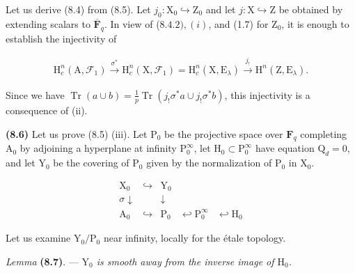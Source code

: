 \documentclass[10pt,leqno]{article}
\begin{document}
\clearpage

\label{physical-33}

\noindent Let us derive (8.4) from (8.5). Let \(j_{0} : \mathrm{X}_{0} \hookrightarrow  \mathrm{Z}_{0}\) and let \(j : \mathrm{X} \hookrightarrow  \mathrm{Z}\) be obtained by extending scalars to \(\overline{\mathbf{F}}_{q}\). In view of (\(8.4.2), (i)\), and (1.7) for \(\mathrm{Z}_{0}\), it is enough to establish the injectivity of\par

\begin{equation*}\begin{gathered}\mathrm{H}_{c}^{n}(\mathrm{A},\mathcal{F} _{1}) \xrightarrow{\sigma ^{*}} \mathrm{H}_{c}^{n}(\mathrm{X},\mathcal{F} _{1}) = \mathrm{H}_{c}^{n}(\mathrm{X},\mathrm{E}_{\lambda }) \xrightarrow{j_{!}} \mathrm{H}^{n}(\mathrm{Z},\mathrm{E}_{\lambda }).\end{gathered}\end{equation*}

\noindent Since we have \(\operatorname{Tr}(a \cup  b) = \frac{1}{p} \operatorname{Tr}(j_{!}\sigma ^{*}a \cup  j_{!}\sigma ^{*}b)\), this injectivity is a consequence of (ii).\par

\noindent \textbf{(8.6)} Let us prove (8.5) (iii). Let \(\mathrm{P}_{0}\) be the projective space over \(\mathbf{F}_{q}\) completing \(\mathrm{A}_{0}\) by adjoining a hyperplane at infinity \(\mathrm{P}_{0}^{\infty }\), let \(\mathrm{H}_{0} \subset  \mathrm{P}_{0}^{\infty }\) have equation \(\mathrm{Q}_{d} = 0\), and let \(\mathrm{Y}_{0}\) be the covering of \(\mathrm{P}_{0}\) given by the normalization of \(\mathrm{P}_{0}\) in \(\mathrm{X}_{0}\).\par

\[\begin{array}{ccccc}\mathrm X_0&\hookrightarrow&\mathrm Y_0&&\\ {\scriptstyle\sigma}\downarrow&&\downarrow&&\\ \mathrm A_0&\hookrightarrow&\mathrm P_0&\hookleftarrow\mathrm P_0^\infty&\hookleftarrow\mathrm H_0\end{array}\tag{8.6.1}\]

\noindent Let us examine \(\mathrm{Y}_{0}/\mathrm{P}_{0}\) near infinity, locally for the étale topology.\par

\noindent \emph{Lemma} \textbf{(8.7)}. — {\itshape \(\mathrm{Y}_{0}\) is smooth away from the inverse image of \(\mathrm{H}_{0}\).}\par
\end{document}
